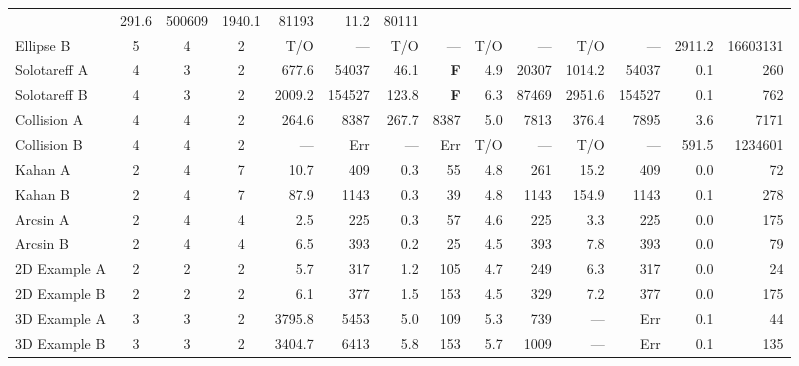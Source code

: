 \documentclass{article}
\begin{document}
\begin{sidewaystable*}
\begin{center}
\begin{tabular}{lccc|rr|rr|rr|rr|rr}
						&  291.6     &  500609     &  1940.1    &  81193   
						& 11.2 & 80111 \\
Ellipse B      & 5 & 4 & 2
						&  T/O       &  ---        &  T/O       &  ---         
						&  T/O       &  ---        &  T/O       &  ---     
						& 2911.2 & 16603131 \\
Solotareff A   & 4 & 3 & 2
						&  677.6     &  54037      &  46.1      &  {\bf F}    
						&  4.9       &  20307      &  1014.2    &  54037   
						& 0.1 & 260 \\   
Solotareff B   & 4 & 3 & 2
						&  2009.2    &  154527     &  123.8     &  {\bf F}     
						&  6.3       &  87469      &  2951.6    &  154527  
						& 0.1 & 762 \\
Collision A    & 4 & 4 & 2
						&  264.6     &  8387       &  267.7     &  8387        
						&  5.0       &  7813       &  376.4     &  7895    
						& 3.6 & 7171 \\ 
Collision B    & 4 & 4 & 2
						&  ---       &  Err        &  ---         &  Err       
						& T/O        &  ---        &  T/O       &  ---     
						& 591.5 & 1234601 \\
Kahan A                 & 2 & 4 & 7
						&  10.7      &  409        &  0.3       &  55          
						&  4.8       &  261        &  15.2      &  409     
						& 0.0 & 72 \\       
Kahan B                 & 2 & 4 & 7
						&  87.9      &  1143       &  0.3       &  39        
						&  4.8       &  1143       &  154.9     &  1143    
						& 0.1 & 278 \\
Arcsin A                & 2 & 4 & 4
						&  2.5       &  225        &  0.3       &  57          
						&  4.6       &  225        &  3.3       &  225     
						& 0.0 & 175 \\       
Arcsin B                & 2 & 4 & 4
						&  6.5       &  393        &  0.2       &  25          
						&  4.5       &  393        &  7.8       &  393     
						& 0.0 & 79 \\
2D Example A            & 2 & 2 & 2
						&  5.7       &  317        &  1.2       &  105         
						&  4.7       &  249        &  6.3       &  317     
						& 0.0 & 24 \\
2D Example B            & 2 & 2 & 2
						&  6.1       &  377        &  1.5       &  153         
						&  4.5       &  329        &  7.2       &  377     
						& 0.0 & 175 \\
3D Example A            & 3 & 3 & 2
						&  3795.8    &  5453       &  5.0       &  109         
						&  5.3       &  739        &  ---       &  Err     
						& 0.1 & 44 \\
3D Example B            & 3 & 3 & 2
						&  3404.7    &  6413       &  5.8       &  153         
						&  5.7       &  1009       &  ---       &  Err     
						& 0.1 & 135 \\
\end{tabular}
\end{center}
\vskip-20pt
\end{sidewaystable*}
\end{document}

